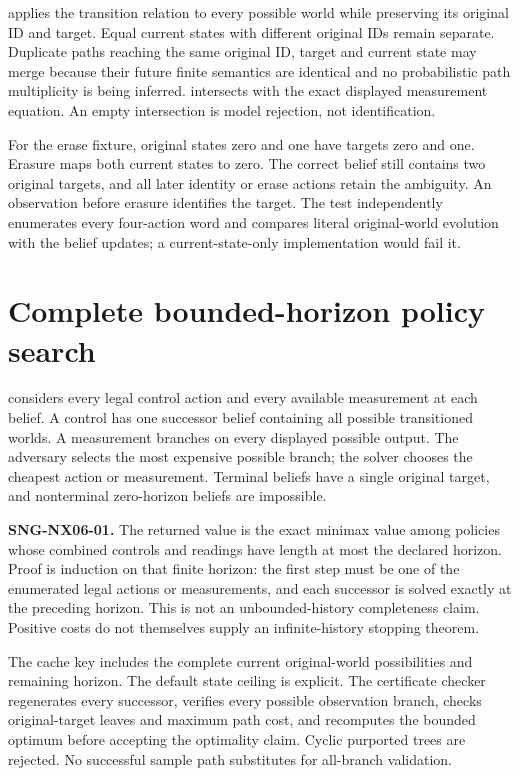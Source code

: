 \documentclass[
  11pt,
  a4paper,
]{report}
\let\singularitytexttt\texttt
\renewcommand{\texttt}[1]{\singularitytexttt{\seqsplit{#1}}}
\begin{document}
\texttt{advance\_belief} applies the transition relation to every
possible world while preserving its original ID and target. Equal
current states with different original IDs remain separate. Duplicate
paths reaching the same original ID, target and current state may merge
because their future finite semantics are identical and no probabilistic
path multiplicity is being inferred. \texttt{condition\_belief}
intersects with the exact displayed measurement equation. An empty
intersection is model rejection, not identification.

For the erase fixture, original states zero and one have targets zero
and one. Erasure maps both current states to zero. The correct belief
still contains two original targets, and all later identity or erase
actions retain the ambiguity. An observation before erasure identifies
the target. The test independently enumerates every four-action word and
compares literal original-world evolution with the belief updates; a
current-state-only implementation would fail it.

\hypertarget{complete-bounded-horizon-policy-search}{%
\section{Complete bounded-horizon policy
search}\label{complete-bounded-horizon-policy-search}}

\texttt{history\_policy\_search} considers every legal control action
and every available measurement at each belief. A control has one
successor belief containing all possible transitioned worlds. A
measurement branches on every displayed possible output. The adversary
selects the most expensive possible branch; the solver chooses the
cheapest action or measurement. Terminal beliefs have a single original
target, and nonterminal zero-horizon beliefs are impossible.

\textbf{SNG-NX06-01.} The returned value is the exact minimax value
among policies whose combined controls and readings have length at most
the declared horizon. Proof is induction on that finite horizon: the
first step must be one of the enumerated legal actions or measurements,
and each successor is solved exactly at the preceding horizon. This is
not an unbounded-history completeness claim. Positive costs do not
themselves supply an infinite-history stopping theorem.

The cache key includes the complete current original-world possibilities
and remaining horizon. The default state ceiling is explicit. The
certificate checker regenerates every successor, verifies every possible
observation branch, checks original-target leaves and maximum path cost,
and recomputes the bounded optimum before accepting the optimality
claim. Cyclic purported trees are rejected. No successful sample path
substitutes for all-branch validation.
\end{document}
